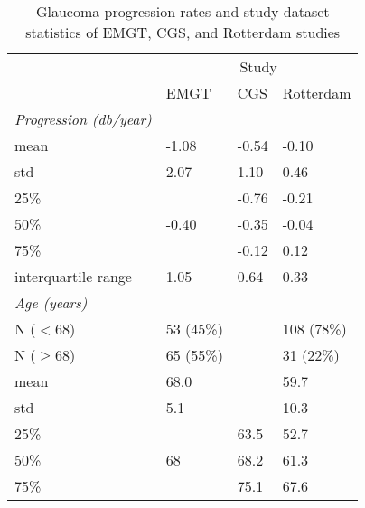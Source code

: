 \begin{table}[h]
\centering
\caption{Glaucoma progression rates and study dataset statistics of \acs{EMGT}, \acs{CGS}, and Rotterdam studies}
\label{tab:glaucprogress}
\begin{tabular}{@{}llll@{}}
	\toprule
	                               &                      \multicolumn{3}{c}{Study}                       \\
	\cmidrule{2-4}                 & \acs{EMGT} \cite{Heijl2009} & \acs{CGS} \cite{Group2010} & Rotterdam \\ \midrule
	\textit{Progression (db/year)} &                             &                            &           \\
	mean                           & -1.08                       & -0.54                      & -0.10     \\
	std                            & 2.07                        & 1.10                       & 0.46      \\
	25\%                           &                             & -0.76                      & -0.21     \\
	50\%                           & -0.40                       & -0.35                      & -0.04     \\
	75\%                           &                             & -0.12                      & 0.12      \\
	interquartile range            & 1.05                        & 0.64                       & 0.33      \\ \midrule
	\textit{Age (years)}           &                             &                            &           \\
	N ($<68$)                      & 53 (45\%)                    &                            & 108 (78\%)          \\
	N ($\geq68$)                   & 65 (55\%)                    &                            & 31 (22\%)          \\
	mean                           & 68.0                        &                            & 59.7          \\
	std                            & 5.1                         &                            & 10.3         \\
	25\%                           &                             & 63.5                       & 52.7         \\
	50\%                           & 68                          & 68.2                       & 61.3          \\
	75\%                           &                             & 75.1                       & 67.6          \\ \bottomrule
\end{tabular}
\end{table}

